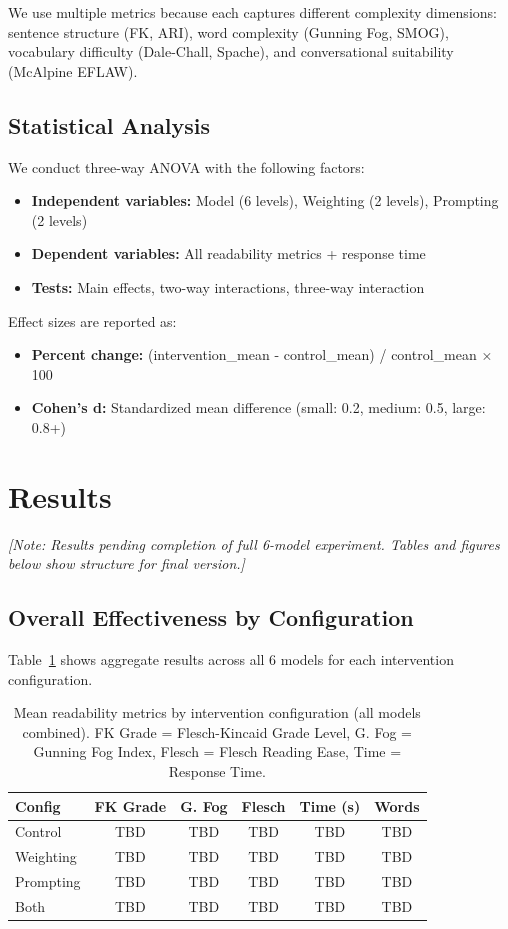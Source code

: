 \documentclass[10pt, a4paper]{article}
\begin{document}
We use multiple metrics because each captures different complexity dimensions: sentence structure (FK, ARI), word complexity (Gunning Fog, SMOG), vocabulary difficulty (Dale-Chall, Spache), and conversational suitability (McAlpine EFLAW).

\subsection{Statistical Analysis}

We conduct three-way ANOVA with the following factors:

\begin{itemize}
\item \textbf{Independent variables:} Model (6 levels), Weighting (2 levels), Prompting (2 levels)
\item \textbf{Dependent variables:} All readability metrics + response time
\item \textbf{Tests:} Main effects, two-way interactions, three-way interaction
\end{itemize}

Effect sizes are reported as:
\begin{itemize}
\item \textbf{Percent change:} (intervention\_mean - control\_mean) / control\_mean × 100
\item \textbf{Cohen's d:} Standardized mean difference (small: 0.2, medium: 0.5, large: 0.8+)
\end{itemize}

\section{Results}

\textit{[Note: Results pending completion of full 6-model experiment. Tables and figures below show structure for final version.]}

\subsection{Overall Effectiveness by Configuration}

Table~\ref{tab:by-config} shows aggregate results across all 6 models for each intervention configuration.

\begin{table}[!ht]
\centering
\small
\begin{tabular}{lccccc}
\hline
\textbf{Config} & \textbf{FK Grade} & \textbf{G. Fog} & \textbf{Flesch} & \textbf{Time (s)} & \textbf{Words} \\
\hline
Control & TBD & TBD & TBD & TBD & TBD \\
Weighting & TBD & TBD & TBD & TBD & TBD \\
Prompting & TBD & TBD & TBD & TBD & TBD \\
Both & TBD & TBD & TBD & TBD & TBD \\
\hline
\end{tabular}
\caption{Mean readability metrics by intervention configuration (all models combined). FK Grade = Flesch-Kincaid Grade Level, G. Fog = Gunning Fog Index, Flesch = Flesch Reading Ease, Time = Response Time.}
\label{tab:by-config}
\end{table}
\end{document}
